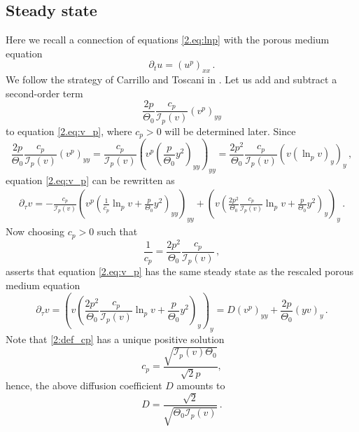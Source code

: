 \documentclass[12pt]{amsart}
\let\pa\partial
\newcommand{\M}{\Theta}
\newcommand{\I}{\mathcal{I}}
\theoremstyle{plain}
\theoremstyle{definition}
\theoremstyle{remark}
\begin{document}
\subsection{Steady state}
Here we recall a connection of equations \eqref{2.eq:lnp} with the porous medium equation 
\begin{equation}\label{2.eq:PM}
    \pa_t u = (u^p)_{xx}\,.
\end{equation}
We follow the strategy of Carrillo and Toscani in \cite{CaTo02}. 
Let us add and subtract a second-order term 
\begin{equation*}
    \frac{2p}{\M_0}\frac{c_p}{\I_p(v)}\left(v^p\right)_{yy}
\end{equation*}
to equation \eqref{2.eq:v_p}, where $c_p>0$ will be determined later. Since 
\begin{equation*}
    \frac{2p}{\M_0}\frac{c_p}{\I_p(v)}\left(v^p\right)_{yy} = \frac{c_p}{\I_p(v)}\left(v^p\left(\frac{p}{\M_0}y^2\right)_{yy}\right)_{yy} = \frac{2p^2}{\M_0}\frac{c_p}{\I_p(v)}\left(v\left(\ln_pv\right)_{y}\right)_{y}\,,
\end{equation*} 
equation \eqref{2.eq:v_p} can be rewritten as
\begin{align*}%
\pa_\tau v = -\frac{c_p}{\I_p(v)}\left(v^p\left(\frac{1}{c_p}\ln_pv + \frac{p}{\M_0}y^2\right)_{yy}\right)_{yy} + \left(v\left(\frac{2p^2}{\M_0}\frac{c_p}{\I_p(v)}\ln_pv + \frac{p}{\M_0}y^2\right)_y\right)_y\,.    
\end{align*}
Now choosing $c_p>0$ such that
\begin{equation}\label{2:def_cp}
    \frac{1}{c_p} = \frac{2p^2}{\M_0}\frac{c_p}{\I_p(v)}\,,
\end{equation}
asserts that equation \eqref{2.eq:v_p} has the same steady state as the rescaled porous medium equation
\begin{equation}\label{2:eq_PM2}
    \pa_\tau v = \left(v\left(\frac{2p^2}{\M_0}\frac{c_p}{\I_p(v)}\ln_pv + \frac{p}{\M_0}y^2\right)_y\right)_y = D(v^p)_{yy} + \frac{2p}{\M_0}(yv)_y\,.
\end{equation}
Note that \eqref{2:def_cp} has a unique positive solution 
\begin{equation*}
    c_p = \frac{\sqrt{\I_p(v)\M_0}}{\sqrt{2}p},
\end{equation*}
hence, the above diffusion coefficient $D$ amounts to
\begin{equation*}
    D = \frac{\sqrt{2}}{\sqrt{\M_0\I_p(v)}}\,.
\end{equation*}
\end{document}
